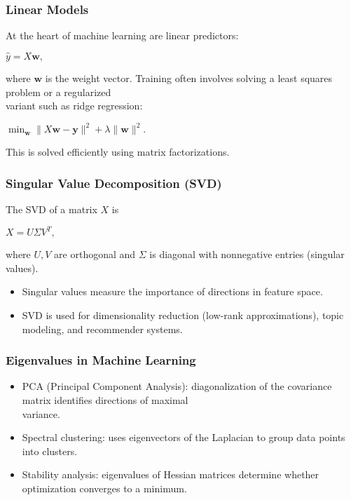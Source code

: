 \documentclass[
  12pt,
  a4paper,
]{article}
\begin{document}
\subsubsection{Linear Models}\label{linear-models}

At the heart of machine learning are linear predictors:

\(\hat{y} = X\mathbf{w},\)

where \(\mathbf{w}\) is the weight vector. Training often involves
solving a least squares problem or a regularized\\
variant such as ridge regression:

\(\min_{\mathbf{w}} \|X\mathbf{w} - \mathbf{y}\|^2 + \lambda \|\mathbf{w}\|^2.\)

This is solved efficiently using matrix factorizations.

\subsubsection{Singular Value Decomposition
(SVD)}\label{singular-value-decomposition-svd}

The SVD of a matrix \(X\) is

\(X = U \Sigma V^T,\)

where \(U, V\) are orthogonal and \(\Sigma\) is diagonal with
nonnegative entries (singular values).

\begin{itemize}
\item
  Singular values measure the importance of directions in feature space.
\item
  SVD is used for dimensionality reduction (low-rank approximations),
  topic modeling, and recommender systems.
\end{itemize}

\subsubsection{Eigenvalues in Machine
Learning}\label{eigenvalues-in-machine-learning}

\begin{itemize}
\item
  PCA (Principal Component Analysis): diagonalization of the covariance
  matrix identifies directions of maximal\\
  variance.
\item
  Spectral clustering: uses eigenvectors of the Laplacian to group data
  points into clusters.
\item
  Stability analysis: eigenvalues of Hessian matrices determine whether
  optimization converges to a minimum.
\end{itemize}
\end{document}
